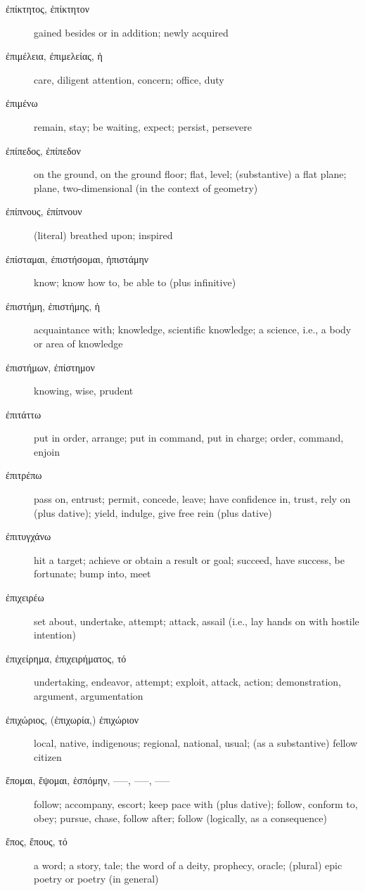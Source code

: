 \documentclass[12pt,letterpaper]{article}
\begin{document}
\begin{description}
    \item[\textgreek{ἐπίκτητος, ἐπίκτητον}] gained besides or in addition; newly acquired
    \item[\textgreek{ἐπιμέλεια, ἐπιμελείας, ἡ}] care, diligent attention, concern; office, duty
    \item[\textgreek{ἐπιμένω}] remain, stay; be waiting, expect; persist, persevere
    \item[\textgreek{ἐπίπεδος, ἐπίπεδον}] on the ground, on the ground floor; flat, level; (substantive) a flat plane; plane, two-dimensional (in the context of geometry)
    \item[\textgreek{ἐπίπνους, ἐπίπνουν}] (literal) breathed upon; inspired
    \item[\textgreek{ἐπίσταμαι, ἐπιστήσομαι, ἠπιστάμην}] know; know how to, be able to (plus infinitive)
    \item[\textgreek{ἐπιστήμη, ἐπιστήμης, ἡ}] \marginnote{*}acquaintance with; knowledge, scientific knowledge; a science, i.e., a body or area of knowledge
    \item[\textgreek{ἐπιστήμων, ἐπίστημον}] knowing, wise, prudent
    \item[\textgreek{ἐπιτάττω}] put in order, arrange; put in command, put in charge; order, command, enjoin
    \item[\textgreek{ἐπιτρέπω}] pass on, entrust; permit, concede, leave; have confidence in, trust, rely on (plus dative); yield, indulge, give free rein (plus dative)
    \item[\textgreek{ἐπιτυγχάνω}] hit a target; achieve or obtain a result or goal; succeed, have success, be fortunate; bump into, meet
    \item[\textgreek{ἐπιχειρέω}] set about, undertake, attempt; attack, assail (i.e., lay hands on with hostile intention)
    \item[\textgreek{ἐπιχείρημα, ἐπιχειρήματος, τό}] undertaking, endeavor, attempt; exploit, attack, action; demonstration, argument, argumentation
    \item[\textgreek{ἐπιχώριος, (ἐπιχωρία,) ἐπιχώριον}] local, native, indigenous; regional, national, usual; (as a substantive) fellow citizen
    \item[\textgreek{ἕπομαι, ἕψομαι, ἑσπόμην, –––, –––, –––}] \marginnote{*}follow; accompany, escort; keep pace with (plus dative); follow, conform to, obey; pursue, chase, follow after; follow (logically, as a consequence)
    \item[\textgreek{ἔπος, ἔπους, τό}] \marginnote{*}a word; a story, tale; the word of a deity, prophecy, oracle; (plural) epic poetry or poetry (in general)

\end{description}
\end{document}
